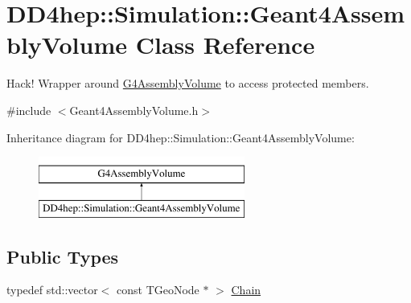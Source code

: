 \hypertarget{class_d_d4hep_1_1_simulation_1_1_geant4_assembly_volume}{}\section{D\+D4hep\+:\+:Simulation\+:\+:Geant4\+Assembly\+Volume Class Reference}
\label{class_d_d4hep_1_1_simulation_1_1_geant4_assembly_volume}


Hack! Wrapper around \hyperlink{class_g4_assembly_volume}{G4\+Assembly\+Volume} to access protected members.  




{\ttfamily \#include $<$Geant4\+Assembly\+Volume.\+h$>$}

Inheritance diagram for D\+D4hep\+:\+:Simulation\+:\+:Geant4\+Assembly\+Volume\+:\begin{figure}[H]
\begin{center}
\leavevmode
\includegraphics[height=2.000000cm]{class_d_d4hep_1_1_simulation_1_1_geant4_assembly_volume}
\end{center}
\end{figure}
\subsection*{Public Types}
\begin{DoxyCompactItemize}
\item 
typedef std\+::vector$<$ const T\+Geo\+Node $\ast$ $>$ \hyperlink{class_d_d4hep_1_1_simulation_1_1_geant4_assembly_volume_ad79481b292635c219fcc03d160689211}{Chain}
\end{DoxyCompactItemize}
